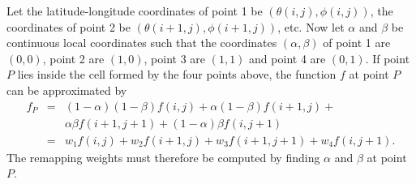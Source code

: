 \documentclass[12pt]{report}
\begin{document}
Let the latitude-longitude coordinates of point
1 be $(\theta(i,j),\phi(i,j))$, the coordinates of
point 2 be $(\theta(i+1,j),\phi(i+1,j))$, etc.
Now let $\alpha$ and $\beta$ be continuous local
coordinates such that the coordinates $(\alpha,\beta)$
of point 1 are $(0,0)$, point 2 are $(1,0)$, point
3 are $(1,1)$ and point 4 are $(0,1)$.  If point $P$
lies inside the cell formed by the four points above,
the function $f$ at point $P$ can be approximated by
\begin{eqnarray}\label{eq:bilinear}
f_P & = & (1-\alpha)(1-\beta)f(i,j) + \alpha(1-\beta)f(i+1,j) + \nonumber \\
    &   & \alpha\beta f(i+1,j+1) + (1-\alpha)\beta f(i,j+1)  \\
    & = & w_1 f(i,j) + w_2 f(i+1,j) + w_3 f(i+1,j+1) + w_4 f(i,j+1). \nonumber
\end{eqnarray}
The remapping weights must therefore be computed by
finding $\alpha$ and $\beta$ at point $P$.
\end{document}
